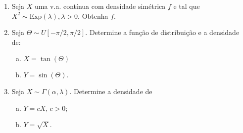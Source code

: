 \documentclass[../Notas.tex]{subfiles}
\begin{document}
\begin{enumerate}
    \item Seja $X$ uma v.a. contínua com densidade simétrica $f$ e tal que $X^2 \sim\text{Exp}(\lambda), \lambda > 0$. Obtenha $f$.
    \item Seja $\Theta \sim U[-\pi/2 , \pi/2]$. Determine a função de distribuição e a densidade de:
    \begin{enumerate}[a)]
    \item $X = \tan(\Theta)$
    \item $Y = \sin(\Theta)$.
    \end{enumerate}
    \item Seja $X\sim\Gamma(\alpha,\lambda)$. Determine a densidade de
    \begin{enumerate}[a)]
    \item $Y = cX$, $c > 0$;
    \item $Y = \sqrt{X}$.
    \end{enumerate}
\end{enumerate}
\end{document}
